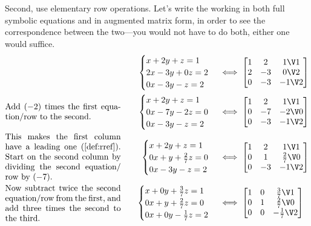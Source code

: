 \begin{example}
\begin{solution}
Second, use elementary row operations.
Let's write the working in both full symbolic equations and in augmented matrix form, in order to see the correspondence between the two---you would not have to do both, either one would suffice.
\begin{align*}&&
\begin{cases}
x+2y+z=1\\ 2x-3y+0z=2\\ 0x-3y-z=2
\end{cases}
&\iff %
\begin{bmatrix} 1&2&1\V1\\2&-3&0\V2\\0&-3&-1\V2 \end{bmatrix}
\\[0ex plus 1ex]&
\parbox{0.4\linewidth}{Add \((-2)\) times the first equation\slash row to the second.}
\quad&
\begin{cases}
x+2y+z=1\\ 0x-7y-2z=0\\ 0x-3y-z=2
\end{cases}
&\iff %
\begin{bmatrix} 1&2&1\V1\\0&-7&-2\V0\\0&-3&-1\V2 \end{bmatrix}
\\[0ex plus 1ex]&
\parbox{0.4\linewidth}{This makes the first column have a leading one (\cref{def:rref}).  Start on the second column by dividing the second equation\slash row by~\((-7)\).}
\quad&
\begin{cases}
x+2y+z=1\\ 0x+y+\frac27z=0\\ 0x-3y-z=2
\end{cases}
&\iff %
\begin{bmatrix} 1&2&1\V1\\0&1&\frac27\V0\\0&-3&-1\V2 \end{bmatrix}
\\[0ex plus 1ex]&
\parbox{0.4\linewidth}{Now subtract twice the second equation\slash row from the first, and add three times the second to the third.}
\quad&
\begin{cases}
x+0y+\frac37z=1\\ 0x+y+\frac27z=0\\ 0x+0y-\frac17z=2
\end{cases}
&\iff %
\begin{bmatrix} 1&0&\frac37\V1\\0&1&\frac27\V0\\0&0&-\frac17\V2 \end{bmatrix}

\end{align*}
\end{solution}
\end{example}
